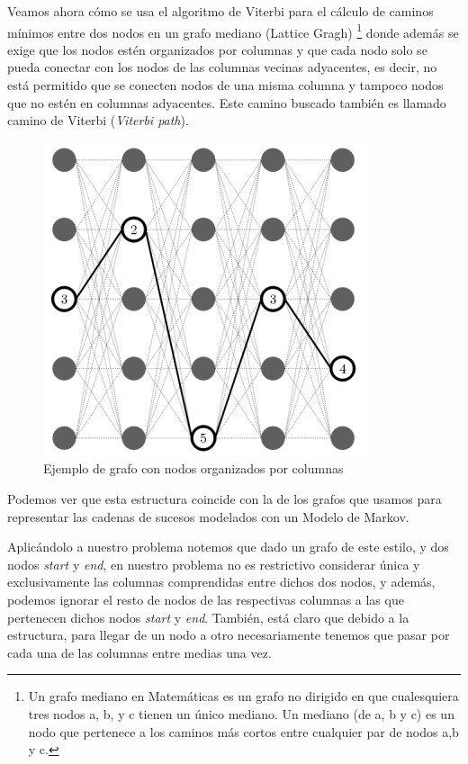 \documentclass{article}
\begin{document}
Veamos ahora cómo se usa el algoritmo de Viterbi para el cálculo de caminos mínimos 
entre dos nodos en un grafo mediano (Lattice Gragh)
\footnote{Un grafo mediano en Matemáticas es un grafo no dirigido en que 
cualesquiera tres nodos a, b, y c tienen un único mediano. Un mediano (de a, b y c) es un nodo 
que pertenece a los caminos más cortos entre cualquier par de nodos a,b y c.}
donde además se exige que los nodos estén organizados por columnas 
y que cada nodo solo se pueda conectar con los nodos de las columnas vecinas adyacentes, es decir, no está permitido que se conecten nodos de una misma columna y tampoco nodos que no estén en columnas adyacentes. Este camino buscado también es llamado camino de Viterbi (\emph{Viterbi path}).

\begin{figure}[!hbt]
    \centering
    \includegraphics[scale=0.5]{Images/IntroViterbi.png}
    \caption{Ejemplo de grafo con nodos organizados por columnas}
\end{figure}

Podemos ver que esta  estructura coincide con la de los grafos que usamos para representar las cadenas de sucesos 
modelados con un Modelo de Markov. 

Aplicándolo a nuestro problema notemos que dado un grafo de este estilo, y dos nodos \textit{start} y \textit{end}, en nuestro problema no es restrictivo 
considerar única y exclusivamente las columnas comprendidas entre dichos dos nodos, y además, podemos 
ignorar el resto de nodos de las respectivas columnas a las que pertenecen dichos nodos
\textit{start} y \textit{end}. También, está claro que debido a la estructura, para llegar de un 
nodo a otro necesariamente tenemos que pasar por cada una de las columnas entre medias una vez. 
\end{document}
